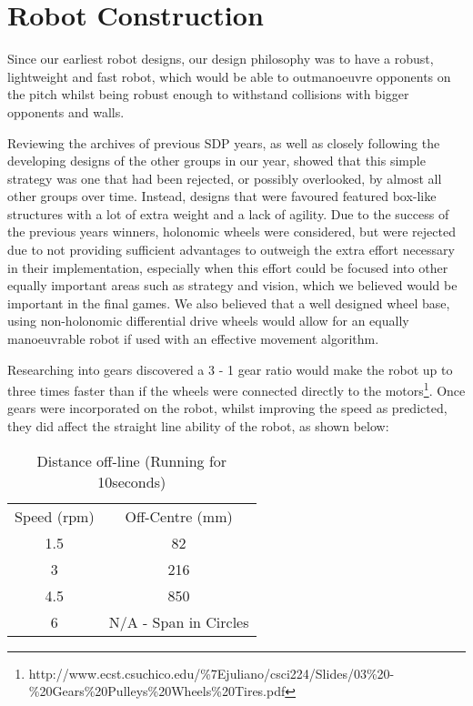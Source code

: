 \section{Robot Construction}

Since our earliest robot designs, our design philosophy was to have a robust, lightweight and fast robot, which would be able to outmanoeuvre opponents on the pitch whilst being robust enough to withstand collisions with bigger opponents and walls. 

Reviewing the archives of previous SDP years, as well as closely following the developing designs of the other groups in our year, showed that this simple strategy was one that had been rejected, or possibly overlooked, by almost all other groups over time. Instead, designs that were favoured featured box-like structures with a lot of extra weight and a lack of agility. Due to the success of the previous years winners, holonomic wheels were considered, but were rejected due to not providing sufficient advantages to outweigh the extra effort necessary in their implementation, especially when this effort could be focused into other equally important areas such as strategy and vision, which we believed would be important in the final games. We also believed that a well designed wheel base, using non-holonomic differential drive wheels would allow for an equally manoeuvrable robot if used with an effective movement algorithm.\linebreak

Researching into gears discovered a 3 - 1 gear ratio would make the robot up to three times faster than if the wheels were connected directly to the motors\footnote{http://www.ecst.csuchico.edu/\%7Ejuliano/csci224/Slides/03\%20-\%20Gears\%20Pulleys\%20Wheels\%20Tires.pdf}. Once gears were incorporated on the robot, whilst improving the speed as predicted, they did affect the straight line ability of the robot, as shown below:
\begin{table}[ht]
\caption{Distance off-line (Running for 10seconds)}
\centering
\begin{tabular}{c c}
\hline\hline
Speed (rpm) & Off-Centre (mm) \\
1.5 & 82 \\
3 & 216 \\
4.5 & 850 \\
6 & N/A - Span in Circles \\
\hline\hline
\end{tabular}
\label{table:offline}
\end{table}

